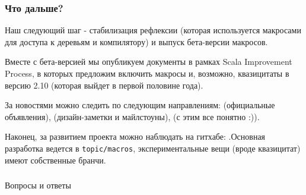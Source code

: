 \documentclass[hyperref={bookmarks=false}]{beamer}
\begin{document}
\begin{frame}[t,fragile]
\frametitle{Что дальше?}

Наш следующий шаг - стабилизация рефлексии (которая используется макросами для доступа к деревьям и компилятору) и выпуск бета-версии макросов.

Вместе с бета-версией мы опубликуем документы в рамках Scala Improvement Process, в которых предложим включить макросы и, возможно, квазицитаты в версию 2.10 (которая выйдет в первой половине года).

За новостями можно следить по следующим направлениям:  (официальные объявления),  (дизайн-заметки и майлстоуны),  (с этим все понятно :)).

Наконец, за развитием проекта можно наблюдать на гитхабе: .Основная разработка ведется в \texttt{topic/macros}, экспериментальные вещи (вроде квазицитат) имеют собственные бранчи.
\end{frame}

\begin{frame}[c, fragile]
\frametitle{}

\centering
{\Large Вопросы и ответы}\\

\centering
{}

\end{frame}
\end{document}
